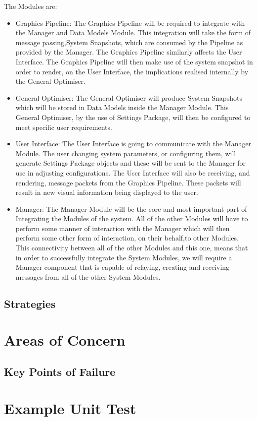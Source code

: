\documentclass[11pt]{article}
\begin{document}
The Modules are:
\begin{itemize}
\item Graphics Pipeline: The Graphics Pipeline will be required to integrate with the Manager and Data Models Module. This integration will take the form of message passing,System Snapshots, which are consumed by the Pipeline as provided by the Manager. The Graphics Pipeline similarly affects the User Interface. The Graphics Pipeline will then make use of the system snapshot in order to render, on the User Interface, the implications realised internally by the General Optimiser.
\item General Optimiser: The General Optimiser will produce System Snapshots which will be stored in Data Models inside the Manager Module. This General Optimiser, by the use of Settings Package, will then be configured to meet specific user requirements. 
\item User Interface: The User Interface is going to communicate with the Manager Module. The user changing system parameters, or configuring them, will generate Settings Package objects and these will be sent to the Manager for use in adjusting configurations. The User Interface will also be receiving, and rendering, message packets from the Graphics Pipeline. These packets will result in new visual information being displayed to the user.
\item Manager: The Manager Module will be the core and most important part of Integrating the Modules of the system. All of the other Modules will have to perform some manner of interaction with the Manager which will then perform some other form of interaction, on their behalf,to other Modules. This connectivity between all of the other Modules and this one, means that in order to successfully integrate the System Modules, we will require a Manager component that is capable of relaying, creating and receiving messages from all of the other System Modules.

\end{itemize}
 
\subsection{Strategies}

\section{Areas of Concern}
\subsection{Key Points of Failure}
\lipsum

\section{Example Unit Test}
\end{document}
